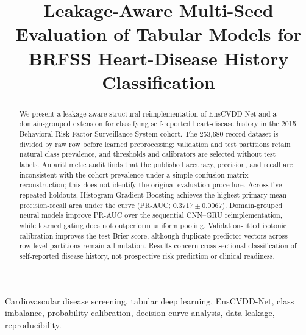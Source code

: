 \documentclass[conference,10pt]{IEEEtran}
\begin{document}
\title{Leakage-Aware Multi-Seed Evaluation of Tabular Models for BRFSS Heart-Disease History Classification}

\author{
}

\maketitle

\begin{abstract}
We present a leakage-aware structural reimplementation of EnsCVDD-Net and a domain-grouped extension for classifying self-reported heart-disease history in the 2015 Behavioral Risk Factor Surveillance System cohort. The 253,680-record dataset is divided by raw row before learned preprocessing; validation and test partitions retain natural class prevalence, and thresholds and calibrators are selected without test labels. An arithmetic audit finds that the published accuracy, precision, and recall are inconsistent with the cohort prevalence under a simple confusion-matrix reconstruction; this does not identify the original evaluation procedure. Across five repeated holdouts, Histogram Gradient Boosting achieves the highest primary mean precision-recall area under the curve (PR-AUC; $0.3717\pm0.0067$). Domain-grouped neural models improve PR-AUC over the sequential CNN--GRU reimplementation, while learned gating does not outperform uniform pooling. Validation-fitted isotonic calibration improves the test Brier score, although duplicate predictor vectors across row-level partitions remain a limitation. Results concern cross-sectional classification of self-reported disease history, not prospective risk prediction or clinical readiness.
\end{abstract}

\begin{IEEEkeywords}
Cardiovascular disease screening, tabular deep learning, EnsCVDD-Net, class imbalance, probability calibration, decision curve analysis, data leakage, reproducibility.
\end{IEEEkeywords}
\end{document}
